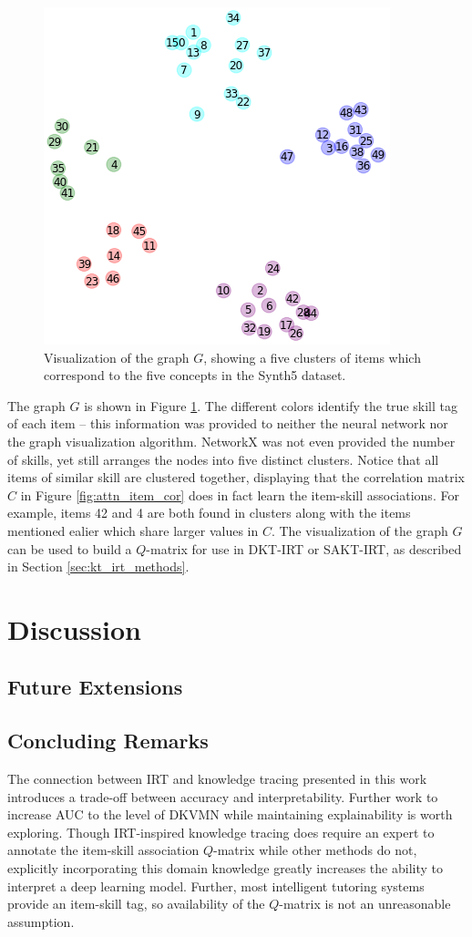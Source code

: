 \begin{figure}[h]
  \centering
  \includegraphics[width=.55\textwidth]{img/kt_irt/synth5_clusters_no_ffn.png}
  \caption{Visualization of the graph $G$, showing a five clusters of items which correspond to the five concepts in the Synth5 dataset.}
  \label{fig:synth5_clusters}
\end{figure}
The graph $G$ is shown in Figure \ref{fig:synth5_clusters}. The different colors identify the true skill tag of each item -- this information was provided to neither the neural network nor the graph visualization algorithm. NetworkX was not even provided the number of skills, yet still arranges the nodes into five distinct clusters. Notice that all items of similar skill are clustered together, displaying that the correlation matrix $C$ in Figure \ref{fig:attn_item_cor} does in fact learn the item-skill associations. For example, items 42 and 4 are both found in clusters along with the items mentioned ealier which share larger values in $C$. The visualization of the graph $G$ can be used to build a $Q$-matrix for use in DKT-IRT or SAKT-IRT, as described in Section \ref{sec:kt_irt_methods}.

\section{Discussion}

\subsection{Future Extensions} 


\subsection{Concluding Remarks}
The connection between IRT and knowledge tracing presented in this work introduces a trade-off between accuracy and interpretability. Further work to increase AUC to the level of DKVMN while maintaining explainability is worth exploring. Though IRT-inspired knowledge tracing does require an expert to annotate the item-skill association $Q$-matrix while other methods do not, explicitly incorporating this domain knowledge greatly increases the ability to interpret a deep learning model. Further, most intelligent tutoring systems provide an item-skill tag, so availability of the $Q$-matrix is not an unreasonable assumption.

